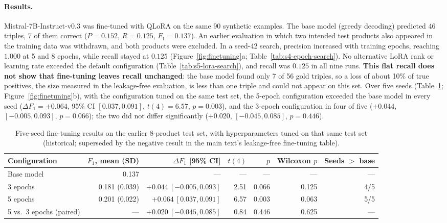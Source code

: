 \documentclass[11pt]{article}
\begin{document}
\paragraph{Results.} Mistral-7B-Instruct-v0.3 was fine-tuned with QLoRA
on the same 90 synthetic examples. The base model (greedy decoding)
predicted 46 triples, 7 of them correct ($P=0.152$, $R=0.125$,
$F_1=0.137$). An earlier evaluation in which two intended test products
also appeared in the training data was withdrawn, and both products
were excluded.
In a seed-42 search, precision increased with training epochs, reaching
$1.000$ at 5 and 8 epochs, while recall stayed at $0.125$
(Figure~\ref{fig:finetuning}a; Table~\ref{tab:s4-epoch-search}). No
alternative LoRA rank or learning rate exceeded the default configuration
(Table~\ref{tab:s5-lora-search}), and recall was $0.125$ in all nine
runs. \textbf{This flat recall does not show that fine-tuning leaves
recall unchanged}: the base model found only 7 of 56 gold triples, so a
loss of about 10\% of true positives, the size measured in the leakage-free evaluation, is
less than one triple and could not appear on this set. Over five seeds
(Table~\ref{tab:finetune-5seed}; Figure~\ref{fig:finetuning}b), with the
configuration tuned on the same test set, the 5-epoch configuration
exceeded the base model in every seed ($\Delta F_1=+0.064$, 95\% CI
$[0.037,0.091]$, $t(4)=6.57$, $p=0.003$), and the 3-epoch configuration
in four of five ($+0.044$, $[-0.005,0.093]$, $p=0.066$); the two did not
differ significantly ($+0.020$, $[-0.045,0.085]$, $p=0.446$).

\begin{table}[htbp]
\centering
\caption{Five-seed fine-tuning results on the earlier 8-product test set, with hyperparameters tuned on that same test set (historical; superseded by the negative result in the main text's leakage-free fine-tuning table).}
\label{tab:finetune-5seed}
\begin{adjustbox}{max width=\textwidth}
\begin{tabular}{@{}lrrrrrr@{}}
\toprule
Configuration & $F_1$, mean (SD) & $\Delta F_1$ [95\% CI] & $t(4)$ & $p$ & Wilcoxon $p$ & Seeds $>$ base \\
\midrule
Base model & 0.137 & --- & --- & --- & --- & --- \\
3 epochs & 0.181 (0.039) & $+0.044\ [-0.005, 0.093]$ & 2.51 & 0.066 & 0.125 & 4/5 \\
5 epochs & 0.201 (0.022) & $+0.064\ [0.037, 0.091]$ & 6.57 & 0.003 & 0.063 & 5/5 \\
5 vs.\ 3 epochs (paired) & --- & $+0.020\ [-0.045, 0.085]$ & 0.84 & 0.446 & 0.625 & --- \\
\bottomrule
\end{tabular}
\end{adjustbox}
\end{table}
\end{document}
